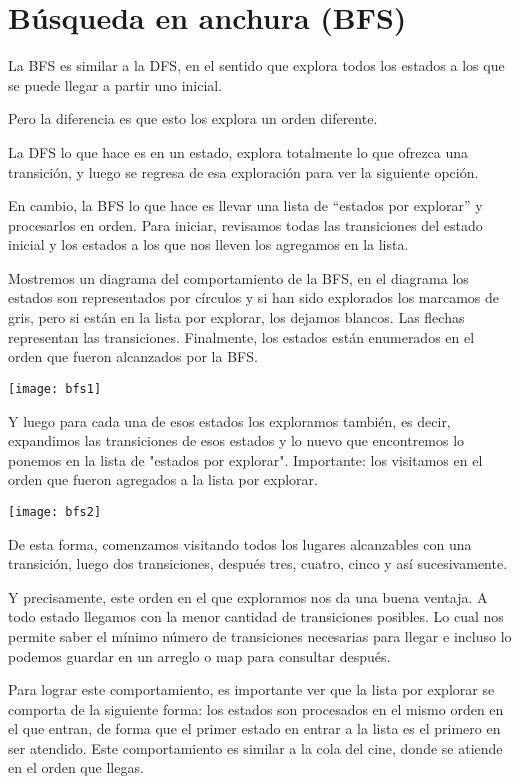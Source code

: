 \chapter{Búsqueda en anchura (BFS)}
La BFS es similar a la DFS, en el sentido que explora todos los estados a los que se puede llegar a partir uno inicial.

Pero la diferencia es que esto los explora un orden diferente.

La DFS lo que hace es en un estado, explora totalmente lo que ofrezca una transición, y luego se regresa de esa exploración para ver la siguiente opción.

En cambio, la BFS lo que hace es llevar una lista de ``estados por explorar'' y procesarlos en orden. Para iniciar, revisamos todas las transiciones del estado inicial y los estados a los que nos lleven los agregamos en la lista.

Mostremos un diagrama del comportamiento de la BFS, en el diagrama los estados son representados por círculos y si han sido explorados los marcamos de gris, pero si están en la lista por explorar, los dejamos blancos. Las flechas representan las transiciones. Finalmente, los estados están enumerados en el orden que fueron alcanzados por la BFS.

\begin{center}
	\texttt{[image: bfs1]}
\end{center}

Y luego para cada una de esos estados los exploramos también, es decir, expandimos las transiciones de esos estados y lo nuevo que encontremos lo ponemos en la lista de "estados por explorar". Importante: los visitamos en el orden que fueron agregados a la lista por explorar.

\begin{center}
	\texttt{[image: bfs2]}
\end{center}

De esta forma, comenzamos visitando todos los lugares alcanzables con una transición, luego dos transiciones, después tres, cuatro, cinco y  así sucesivamente.

Y precisamente, este orden en el que exploramos nos da una buena ventaja. A todo estado llegamos con la menor cantidad de transiciones posibles. Lo cual nos permite saber el mínimo número de transiciones necesarias para llegar e incluso lo podemos guardar en un arreglo o map para consultar después.

Para lograr este comportamiento, es importante ver que la lista por explorar se comporta de la siguiente forma: los estados son procesados en el mismo orden en el que entran, de forma que el primer estado en entrar a la lista es el primero en ser atendido. Este comportamiento es similar a la cola del cine, donde se atiende en el orden que llegas.

